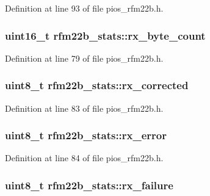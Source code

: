 \-Definition at line 93 of file pios\-\_\-rfm22b.\-h.

\hypertarget{structrfm22b__stats_a4a173cf22afe7f957dc268d65ab1833c}{
\subsubsection[{rx\-\_\-byte\-\_\-count}]{\setlength{\rightskip}{0pt plus 5cm}uint16\-\_\-t {\bf rfm22b\-\_\-stats\-::rx\-\_\-byte\-\_\-count}}}\label{structrfm22b__stats_a4a173cf22afe7f957dc268d65ab1833c}


\-Definition at line 79 of file pios\-\_\-rfm22b.\-h.

\hypertarget{structrfm22b__stats_aff132143dc1206acab2aa0972429aaba}{
\subsubsection[{rx\-\_\-corrected}]{\setlength{\rightskip}{0pt plus 5cm}uint8\-\_\-t {\bf rfm22b\-\_\-stats\-::rx\-\_\-corrected}}}\label{structrfm22b__stats_aff132143dc1206acab2aa0972429aaba}


\-Definition at line 83 of file pios\-\_\-rfm22b.\-h.

\hypertarget{structrfm22b__stats_aa732f9f0055fff25329e07f6b4cce221}{
\subsubsection[{rx\-\_\-error}]{\setlength{\rightskip}{0pt plus 5cm}uint8\-\_\-t {\bf rfm22b\-\_\-stats\-::rx\-\_\-error}}}\label{structrfm22b__stats_aa732f9f0055fff25329e07f6b4cce221}


\-Definition at line 84 of file pios\-\_\-rfm22b.\-h.

\hypertarget{structrfm22b__stats_a4acb04b442511cd543677d8d8e7b4a81}{
\subsubsection[{rx\-\_\-failure}]{\setlength{\rightskip}{0pt plus 5cm}uint8\-\_\-t {\bf rfm22b\-\_\-stats\-::rx\-\_\-failure}}}\label{structrfm22b__stats_a4acb04b442511cd543677d8d8e7b4a81}


